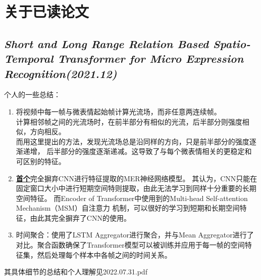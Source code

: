 \documentclass[AutoFakeBold]{MyFormat}
\begin{document}
\chapter{关于已读论文}
\section{\textit{Short and Long Range Relation
Based Spatio-Temporal Transformer for
Micro Expression Recognition(2021.12)}\cite{zhang2021short}}
\par 个人的一些总结：

\begin{enumerate}
    \item 将视频中每一帧与微表情起始帧计算光流场，而非任意两连续帧。\\
    计算相邻帧之间的光流场时，在前半部分有相似的光流，后半部分则强度相似，方向相反。\\
    而用这里提出的方法，发现光流场总是沿同样的方向，只是前半部分的强度逐渐递增，
    后半部分的强度逐渐递减。这导致了与每个微表情相关的更稳定和可区别的特征。
    \item \textbf{\Large \underline{首个}}完全摒弃CNN进行特征提取的MER神经网络模型。
    其认为，CNN只能在固定窗口大小中进行短期空间特则提取，由此无法学习到同样十分重要的长期空间特征。
    而Encoder of Transformer中使用到的Multi-head Self-attention Mechanism（MSM）自注意力
    机制，可以很好的学习到短期和长期空间特征，由此其完全摒弃了CNN的使用。
    \item 时间聚合：使用了LSTM Aggregator进行聚合，并与Mean Aggregator进行了对比。聚合函数确保了Transformer模型可以被训练并应用于每一帧的空间特征集，然后处理每个样本中各帧之间的时间关系。
\end{enumerate}
\par 其具体细节的总结和个人理解见2022.07.31.pdf

\normalem


\end{document}
